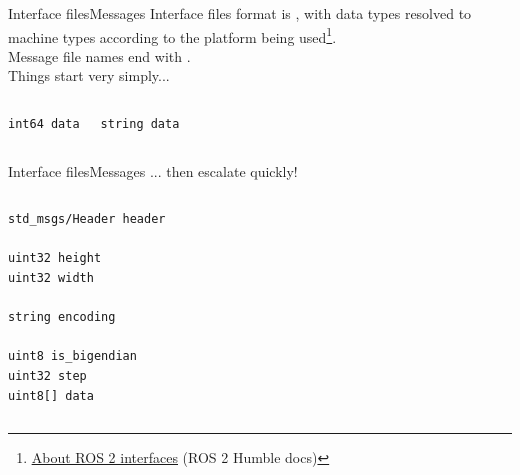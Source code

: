 \begin{frame}[fragile]{Interface files}{Messages}
	Interface files format is , with data types resolved to machine types according to the platform being used\footnote{\href{https://docs.ros.org/en/humble/Concepts/About-ROS-Interfaces.html}{\color{blue}\underline{About ROS 2 interfaces}} (ROS 2 Humble docs)}.\\
	Message file names end with .\\
	Things start very simply...

	\begin{columns}
		\begin{lstlisting}[language=ros2msg, caption=Definition of the \texttt{std\_msgs/msg/Int64} message.]
int64 data\end{lstlisting}

		\begin{lstlisting}[language=ros2msg, caption=Definition of the \texttt{std\_msgs/msg/String} message.]
string data\end{lstlisting}
	\end{columns}

\end{frame}
\begin{frame}[fragile]{Interface files}{Messages}
	... then escalate quickly!

	\begin{columns}
		\column{.9\textwidth}
		\begin{lstlisting}[language=ros2msg, caption=Definition of the \texttt{sensor\_msgs/msg/Image} composite message.]
std_msgs/Header header

uint32 height
uint32 width

string encoding

uint8 is_bigendian
uint32 step
uint8[] data\end{lstlisting}
	\end{columns}

\end{frame}
